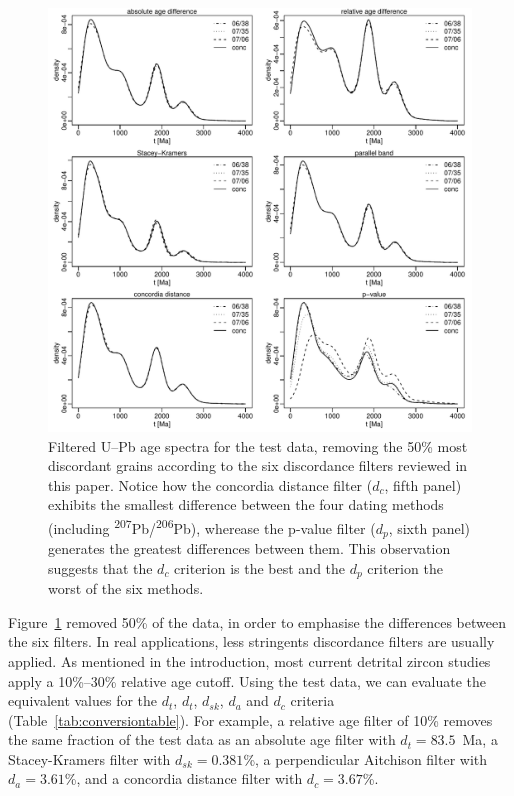 \documentclass[gchron, manuscript]{copernicus}
\begin{document}
\begin{figure}[t]
  \includegraphics[width=12cm]{KDEs.pdf}
  \caption{Filtered U--Pb age spectra for the test data, removing the
    50\% most discordant grains according to the six discordance
    filters reviewed in this paper. Notice how the concordia distance
    filter ($d_c$, fifth panel) exhibits the smallest difference
    between the four dating methods (including
    \textsuperscript{207}Pb/\textsuperscript{206}Pb), wherease the
    p-value filter ($d_p$, sixth panel) generates the greatest
    differences between them.  This observation suggests that the
    $d_c$ criterion is the best and the $d_p$ criterion the worst of
    the six methods.
  }
  \label{fig:KDEs}
\end{figure}

Figure~\ref{fig:KDEs} removed 50\% of the data, in order to emphasise
the differences between the six filters. In real applications, less
stringents discordance filters are usually applied. As mentioned in
the introduction, most current detrital zircon studies apply a
10\%--30\% relative age cutoff.  Using the test data, we can evaluate
the equivalent values for the $d_t$, $d_t$, $d_{sk}$, $d_a$ and $d_c$
criteria (Table~\ref{tab:conversiontable}). For example, a relative
age filter of 10\% removes the same fraction of the test data as an
absolute age filter with $d_t=83.5$~Ma, a Stacey-Kramers filter with
$d_{sk}=0.381$\%, a perpendicular Aitchison filter with $d_a=3.61$\%,
and a concordia distance filter with $d_c=3.67$\%.
\end{document}
